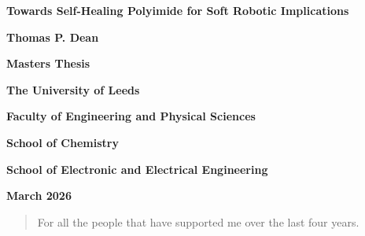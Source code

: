\begin{center}
    \LARGE \textbf{Towards Self-Healing Polyimide for Soft Robotic Implications}
\end{center}
\vspace{1cm}
\begin{center}
    \Large \textbf{Thomas P. Dean}
\end{center}
\vspace{2cm}

\begin{center}
    \Large \textbf{Masters Thesis}
\end{center}
\vspace{2cm}

\begin{center}
    \Large \textbf{The University of Leeds}

    \Large \textbf{Faculty of Engineering and Physical Sciences}
    
    \Large \textbf{School of Chemistry}
    
    \Large \textbf{School of Electronic and Electrical Engineering}
\end{center}
\vspace{1cm}
\begin{center}
    \Large \textbf{March 2026}
\end{center}

\normalsize
\doublespacing
\setcounter{page}{0}

\newpage
\thispagestyle{empty}
\vspace*{\fill} %
\begin{center}
\begin{quote}
\centering
    For all the people that have supported me over the last four years.
\end{quote}
\end{center}
\vspace*{\fill} %




